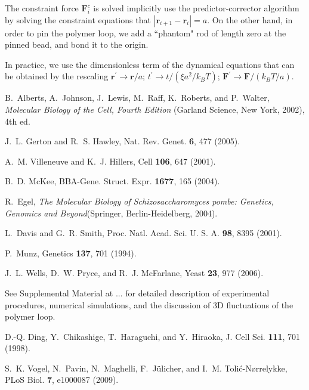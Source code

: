 \documentclass[aps,showpacs,twocolumn,floatfix,prx,superscriptaddress]{revtex4-1}
\begin{document}
The constraint force $\mathbf{F}_i^c$ is solved implicitly use the predictor-corrector algorithm by solving the constraint equations that $|\mathbf{r}_{i+1}-\mathbf{r}_i| = a$. On the other hand, in order to pin the polymer loop, we add a ``phantom" rod of length zero at the pinned bead, and bond it to the origin.

In practice, we use the dimensionless term of the dynamical equations that can be obtained by the rescaling $\mathbf{r}^{\prime}\to \mathbf{r}/a$; $t^{\prime}\to t/(\xi a^2/k_BT)$; $\mathbf{F}^{\prime}\to\mathbf{F}/(k_BT/a)$.





%

\begin{thebibliography}{10}


B.~Alberts,
  A.~Johnson,
  J.~Lewis,
  M.~Raff,
  K.~Roberts, and
  P.~Walter,
  \emph{Molecular Biology of the Cell, Fourth Edition}
  (Garland Science, New York, 2002),
  4th ed.

J.~L. Gerton and
  R.~S. Hawley,
  Nat. Rev. Genet. \textbf{6},
  477 (2005).

A.~M. Villeneuve
  and K.~J.
  Hillers, Cell
  \textbf{106}, 647 (2001).

B.~D. McKee,
  BBA-Gene. Struct. Expr. \textbf{1677}, 165 
  (2004).

R.~Egel,
  \emph{The Molecular Biology of Schizosaccharomyces pombe:
  Genetics, Genomics and Beyond}(Springer, Berlin-Heidelberg,
  2004).

L.~Davis and
  G.~R. Smith,
  Proc. Natl. Acad. Sci. U. S. A.
  \textbf{98}, 8395 (2001).

P.~Munz,
  Genetics \textbf{137},
  701 (1994).

J.~L. Wells,
  D.~W. Pryce, and
  R.~J. McFarlane,
  Yeast \textbf{23}, 977
  (2006).
  
  See Supplemental Material at ... for detailed description of experimental procedures, numerical simulations, and the discussion of 3D fluctuations of the polymer loop.

D.-Q. Ding,
  Y.~Chikashige,
  T.~Haraguchi,
  and Y.~Hiraoka,
  J. Cell Sci. \textbf{111},
  701 (1998).

S.~K. Vogel,
  N.~Pavin,
  N.~Maghelli,
  F.~J\"ulicher,
  and I.~M.
  Toli\'c-N\o rrelykke, PLoS Biol.
  \textbf{7}, e1000087
  (2009).


\end{thebibliography}
\end{document}

